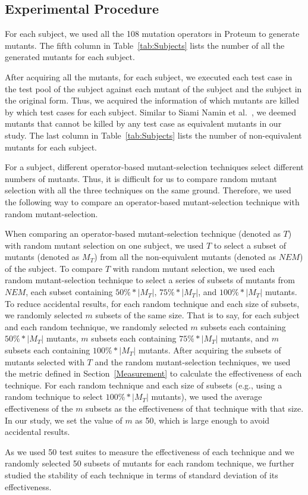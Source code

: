 \vspace{-1ex}
\subsection{Experimental Procedure}
\label{Procedure}

For each subject, we used all the 108 mutation operators in
Proteum to generate mutants. The fifth column in
Table~\ref{tab:Subjects} lists the number of all the generated
mutants for each subject.

After acquiring all the mutants, for each subject, we executed
each test case in the test pool of the subject against each mutant
of the subject and the subject in the original form. Thus, we
acquired the information of which mutants are killed by which test
cases for each subject. Similar to Siami Namin et
al.~\cite{SiamiNamin:08}, we deemed mutants that cannot be killed
by any test case as equivalent mutants in our study. The last
column in Table~\ref{tab:Subjects} lists the number of
non-equivalent mutants for each subject.

For a subject, different operator-based mutant-selection
techniques select different numbers of mutants. Thus, it is
difficult for us to compare random mutant selection with all the
three techniques on the same ground. Therefore, we used the
following way to compare an operator-based mutant-selection
technique with random mutant-selection.

When comparing an operator-based mutant-selection technique
(denoted as $T$) with random mutant selection on one subject, we
used $T$ to select a subset of mutants (denoted as $M_T$) from all
the non-equivalent mutants (denoted as $NEM$) of the subject. To
compare $T$ with random mutant selection, we used each random
mutant-selection technique to select a series of subsets of
mutants from $NEM$, each subset containing $50\%*|M_T|$,
$75\%*|M_T|$, and $100\%*|M_T|$ mutants. To reduce accidental
results, for each random technique and each size of subsets, we
randomly selected $m$ subsets of the same size. That is to say,
for each subject and each random technique, we randomly selected
$m$ subsets each containing $50\%*|M_T|$ mutants, $m$ subsets each
containing $75\%*|M_T|$ mutants, and $m$ subsets each containing
$100\%*|M_T|$ mutants. After acquiring the subsets of mutants
selected with $T$ and the random mutant-selection techniques, we
used the metric defined in Section~\ref{Measurement} to calculate
the effectiveness of each technique. For each random technique and
each size of subsets (e.g., using a random technique to select
$100\%*|M_T|$ mutants), we used the average effectiveness of the
$m$ subsets as the effectiveness of that technique with that size.
In our study, we set the value of $m$ as 50, which is large enough
to avoid accidental results.

As we used 50 test suites to measure the effectiveness of each
technique and we randomly selected 50 subsets of mutants for each
random technique, we further studied the stability of each
technique in terms of standard deviation of its effectiveness.
